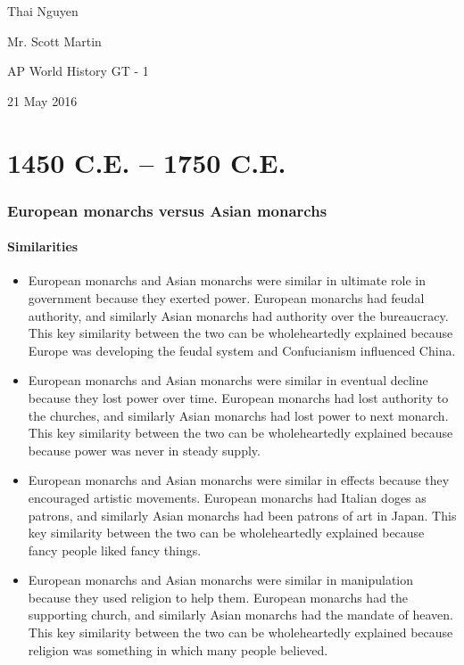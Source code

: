 \documentclass[letterpaper, 10pt]{article}
\begin{document}
    \setcounter{secnumdepth}{-1}

    Thai Nguyen

    Mr. Scott Martin

    AP World History GT - 1

    21 May 2016


    \part{1450 C.E. -- 1750 C.E.}
        \section{European monarchs versus Asian monarchs}
            \subsection{Similarities}
                \begin{itemize}
                    \item European monarchs and Asian monarchs were similar in ultimate role in government because they exerted power. European monarchs had feudal authority, and similarly Asian monarchs had authority over the bureaucracy. This key similarity between the two can be wholeheartedly explained because Europe was developing the feudal system and Confucianism influenced China.
                    \item European monarchs and Asian monarchs were similar in eventual decline because they lost power over time. European monarchs had lost authority to the churches, and similarly Asian monarchs had lost power to next monarch. This key similarity between the two can be wholeheartedly explained because because power was never in steady supply.
                    \item European monarchs and Asian monarchs were similar in effects because they encouraged artistic movements. European monarchs had Italian doges as patrons, and similarly Asian monarchs had been patrons of art in Japan. This key similarity between the two can be wholeheartedly explained because fancy people liked fancy things.
                    \item European monarchs and Asian monarchs were similar in manipulation because they used religion to help them. European monarchs had the supporting church, and similarly Asian monarchs had the mandate of heaven. This key similarity between the two can be wholeheartedly explained because religion was something in which many people believed.
                \end{itemize}
\end{document}
